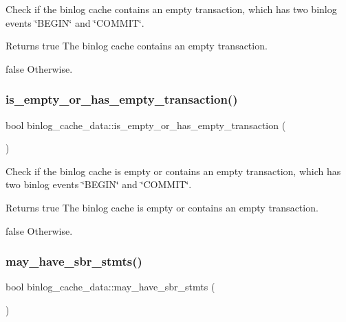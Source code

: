 Check if the binlog cache contains an empty transaction, which has two binlog events \char`\"{}\+B\+E\+G\+I\+N\char`\"{} and \char`\"{}\+C\+O\+M\+M\+I\+T\char`\"{}.

\begin{DoxyReturn}{Returns}
true The binlog cache contains an empty transaction. 

false Otherwise. 
\end{DoxyReturn}
\mbox{\label{classbinlog__cache__data_a481b44b5de62e1c0f066cc40384c2050}} 
\subsubsection{\texorpdfstring{is\+\_\+empty\+\_\+or\+\_\+has\+\_\+empty\+\_\+transaction()}{is\_empty\_or\_has\_empty\_transaction()}}
{\footnotesize\ttfamily bool binlog\+\_\+cache\+\_\+data\+::is\+\_\+empty\+\_\+or\+\_\+has\+\_\+empty\+\_\+transaction (\begin{DoxyParamCaption}{ }\end{DoxyParamCaption})\hspace{0.3cm}{\ttfamily [inline]}}

Check if the binlog cache is empty or contains an empty transaction, which has two binlog events \char`\"{}\+B\+E\+G\+I\+N\char`\"{} and \char`\"{}\+C\+O\+M\+M\+I\+T\char`\"{}.

\begin{DoxyReturn}{Returns}
true The binlog cache is empty or contains an empty transaction. 

false Otherwise. 
\end{DoxyReturn}
\mbox{\label{classbinlog__cache__data_a319126ba2342471ddccecca34d1e7964}} 
\subsubsection{\texorpdfstring{may\+\_\+have\+\_\+sbr\+\_\+stmts()}{may\_have\_sbr\_stmts()}}
{\footnotesize\ttfamily bool binlog\+\_\+cache\+\_\+data\+::may\+\_\+have\+\_\+sbr\+\_\+stmts (\begin{DoxyParamCaption}{ }\end{DoxyParamCaption})\hspace{0.3cm}{\ttfamily [inline]}}

